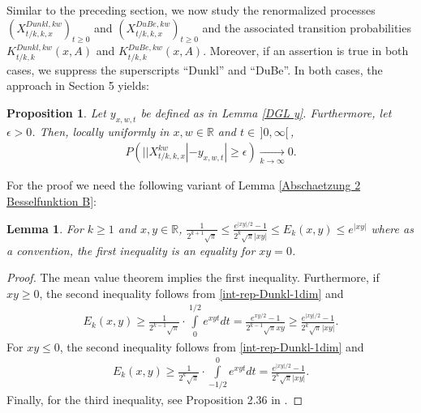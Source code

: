 \documentclass[reqno]{amsart}
\theoremstyle{plain}
\newtheorem{lemma}[theorem]{Lemma}
\newtheorem{proposition}[theorem]{Proposition}
\theoremstyle{definition}
\numberwithin{equation}{section}
\newcommand{\R}{\mathbb{R}}
\begin{document}
Similar to the preceding section, we now study the renormalized processes $(X^{Dunkl,kw}_{t/k,k,x})_{t \geq 0}$ 
and $(X^{DuBe,kw}_{t/k,k,x})_{t \geq 0}$ and the associated transition probabilities $K_{t/k,k}^{Dunkl,kw}(x,A)$ and $K_{t/k,k}^{DuBe,kw}(x,A)$.
Moreover, if an assertion is true in both cases, we  suppress the superscripts ``Dunkl'' and ``DuBe''.
In both cases, the approach in Section 5 yields:

\begin{proposition}\label{schwacher Limes Dunkl Schritt 1}
Let $y_{x,w,t}$ be defined as in Lemma \ref{DGL y}. 
Furthermore, let $\epsilon>0$.
Then, locally uniformly in $x,w \in \R$ and $t \in \,]0,\infty[\,$,
\begin{align*}
P(||X^{kw}_{t/k,k,x}|-y_{x,w,t}| \geq \epsilon) 
\xrightarrow[k \to \infty]{} 0.
\end{align*}
\end{proposition}

For the proof we need the following variant of Lemma \ref{Abschaetzung 2 Besselfunktion B}:

\begin{lemma}\label{Abschaetzung Dunklkern N=1}
For $k \geq 1$ and $x,y \in \R$, 
$\frac{1}{2^{k+1}\sqrt{\pi}} \leq \frac{e^{|xy|/2}-1}{2^{k} \sqrt{\pi} |xy|} \leq E_k(x,y) \leq e^{|xy|}$
where as a convention, the first inequality is an equality for $xy=0$.
\end{lemma}

\begin{proof}
The mean value theorem implies the first inequality.
Furthermore, if $x y \geq 0$, the second inequality follows from \eqref{int-rep-Dunkl-1dim} and
\begin{align*}
E_k(x,y) \geq \frac{1}{2^{k-1}\sqrt{\pi}} \cdot \int\limits_0^{1/2} e^{xyt}dt = \frac{e^{xy/2}-1}{2^{k-1} \sqrt{\pi} xy} \geq \frac{e^{|xy|/2}-1}{2^{k} \sqrt{\pi} |xy|}.
\end{align*}
For $x y \le 0$, the second inequality follows from \eqref{int-rep-Dunkl-1dim} and
\begin{align*}
E_k(x,y) \geq \frac{1}{2^{k}\sqrt{\pi}} \cdot \int\limits_{-1/2}^{0} e^{xyt}dt = \frac{e^{|xy|/2}-1}{2^{k} \sqrt{\pi} |xy|}.
\end{align*}
Finally, for the third inequality, see Proposition 2.36 in \cite{R3}.
\end{proof}
\end{document}
